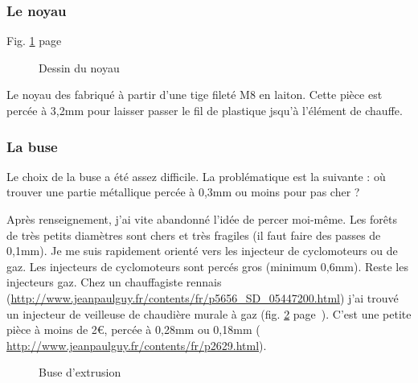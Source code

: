 \subsubsection{Le noyau}%
Fig. \ref{sch_noyau} page~\pageref{sch_noyau} \par %
\begin{figure}%
   \caption{\label{sch_noyau} Dessin du noyau}%
\end{figure}%
Le noyau des fabriqué à partir d'une tige fileté M8 en laiton. Cette pièce est percée à 3,2mm %
pour laisser passer le fil de plastique jsqu'à l'élément de chauffe.%
\subsubsection{La buse}%
Le choix de la buse a été assez difficile. La problématique est la suivante : où trouver %
une partie métallique percée à 0,3mm ou moins pour pas cher ? \par%
Après renseignement, j'ai vite abandonné l'idée de percer moi-même. Les forêts de très petits %
diamètres sont chers et très fragiles (il faut faire des passes de 0,1mm).%
Je me suis rapidement orienté vers les injecteur de cyclomoteurs ou de gaz. Les injecteurs de %
cyclomoteurs sont percés gros (minimum 0,6mm). Reste les injecteurs gaz. Chez un chauffagiste %
rennais (\url{http://www.jeanpaulguy.fr/contents/fr/p5656_SD_05447200.html}) j'ai trouvé un injecteur de veilleuse de chaudière murale à gaz (fig. \ref{buse} %
page~\pageref{buse}). C'est une petite pièce à moins de 2\euro{}, percée à 0,28mm ou 0,18mm (%
\url{http://www.jeanpaulguy.fr/contents/fr/p2629.html}).%
\begin{figure}%
   \caption{\label{buse} Buse d'extrusion}%
\end{figure}%